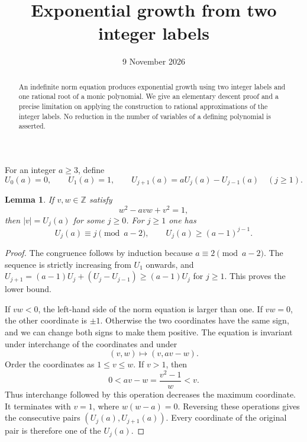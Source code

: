 \documentclass[11pt]{article}
\title{Exponential growth from two integer labels}
\author{}
\date{9 November 2026}
\newtheorem{lemma}[theorem]{Lemma}
\newcommand{\Z}{\mathbb Z}
\begin{document}
\maketitle
\begin{abstract}
An indefinite norm equation produces exponential growth using two
integer labels and one rational root of a monic polynomial. We give an
elementary descent proof and a precise limitation on applying the
construction to rational approximations of the integer labels. No
reduction in the number of variables of a defining polynomial is
asserted.
\end{abstract}

For an integer $a\ge3$, define
\[
 U_0(a)=0,\qquad U_1(a)=1,\qquad
 U_{j+1}(a)=aU_j(a)-U_{j-1}(a)\quad(j\ge1).
\]

\begin{lemma}\label{lem:descent}
If $v,w\in\Z$ satisfy
\[
                       w^2-avw+v^2=1,
\]
then $|v|=U_j(a)$ for some $j\ge0$.
For $j\ge1$ one has
\[
 U_j(a)\equiv j\pmod{a-2},\qquad
 U_j(a)\ge(a-1)^{j-1}.
\]
\end{lemma}
\begin{proof}
The congruence follows by induction because $a\equiv2\pmod{a-2}$.
The sequence is strictly increasing from $U_1$ onwards, and
$U_{j+1}=(a-1)U_j+(U_j-U_{j-1})\ge(a-1)U_j$ for $j\ge1$.
This proves the lower bound.

If $vw<0$, the left-hand side of the norm equation is larger than
one. If $vw=0$, the other coordinate is $\pm1$. Otherwise the two
coordinates have the same sign, and we can change both signs to
make them positive. The equation is invariant under interchange
of the coordinates and under
\[
                         (v,w)\longmapsto(v,av-w).
\]
Order the coordinates as $1\le v\le w$. If $v>1$, then
\[
                  0<av-w=\frac{v^2-1}{w}<v.
\]
Thus interchange followed by this operation decreases the maximum
coordinate. It terminates with $v=1$, where $w(w-a)=0$.
Reversing these operations gives the consecutive pairs
$(U_j(a),U_{j+1}(a))$. Every coordinate of the original pair is
therefore one of the $U_j(a)$.
\end{proof}
\end{document}
